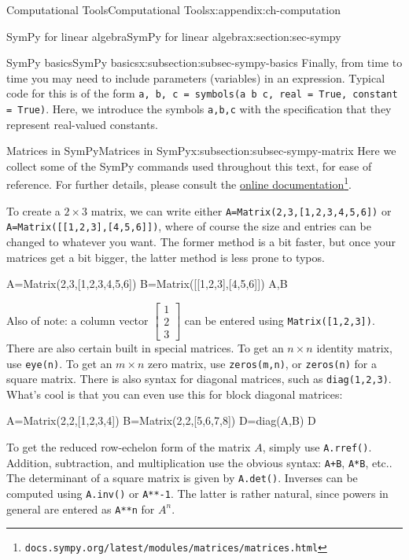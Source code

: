 \documentclass[oneside,10pt,]{book}
\newcommand{\mono}[1]{\texttt{#1}}
\numberwithin{equation}{section}
\newcommand{\bbm}{\begin{bmatrix}}
\newcommand{\ebm}{\end{bmatrix}}
\begin{document}
\begin{appendixptx}{Computational Tools}{}{Computational Tools}{}{}{x:appendix:ch-computation}
\begin{sectionptx}{SymPy for linear algebra}{}{SymPy for linear algebra}{}{}{x:section:sec-sympy}
\begin{subsectionptx}{SymPy basics}{}{SymPy basics}{}{}{x:subsection:subsec-sympy-basics}
Finally, from time to time you may need to include parameters (variables) in an expression. Typical code for this is of the form \mono{a, b, c = symbols(\textquotesingle{}a b c\textquotesingle{}, real = True, constant = True)}. Here, we introduce the symbols \mono{a,b,c} with the specification that they represent real-valued constants.%
\end{subsectionptx}
%
%
\typeout{************************************************}
\typeout{************************************************}
%
\begin{subsectionptx}{Matrices in SymPy}{}{Matrices in SymPy}{}{}{x:subsection:subsec-sympy-matrix}
Here we collect some of the SymPy commands used throughout this text, for ease of reference. For further details, please consult the \href{https://docs.sympy.org/latest/modules/matrices/matrices.html}{online documentation}\footnote{\nolinkurl{docs.sympy.org/latest/modules/matrices/matrices.html}\label{g:fn:idp142}}.%
\par
To create a \(2\times 3\) matrix, we can write either \mono{A=Matrix(2,3,[1,2,3,4,5,6])} or \mono{A=Matrix([[1,2,3],[4,5,6]])}, where of course the size and entries can be changed to whatever you want. The former method is a bit faster, but once your matrices get a bit bigger, the latter method is less prone to typos.%
\begin{sageinput}
A=Matrix(2,3,[1,2,3,4,5,6])
B=Matrix([[1,2,3],[4,5,6]])
A,B
\end{sageinput}
Also of note: a column vector \(\bbm 1\\2\\3\ebm\) can be entered using \mono{Matrix([1,2,3])}. There are also certain built in special matrices. To get an \(n\times n\) identity matrix, use \mono{eye(n)}. To get an \(m\times n\) zero matrix, use \mono{zeros(m,n)}, or \mono{zeros(n)} for a square matrix. There is also syntax for diagonal matrices, such as \mono{diag(1,2,3)}. What's cool is that you can even use this for block diagonal matrices:%
\begin{sageinput}
A=Matrix(2,2,[1,2,3,4])
B=Matrix(2,2,[5,6,7,8])
D=diag(A,B)
D
\end{sageinput}
To get the reduced row-echelon form of the matrix \(A\), simply use \mono{A.rref()}. Addition, subtraction, and multiplication use the obvious syntax: \mono{A+B}, \mono{A*B}, etc.\@. The determinant of a square matrix is given by \mono{A.det()}. Inverses can be computed using \mono{A.inv()} or \mono{A**-1}. The latter is rather natural, since powers in general are entered as \mono{A**n} for \(A^n\).%

\end{subsectionptx}
\end{sectionptx}
\end{appendixptx}
\end{document}

